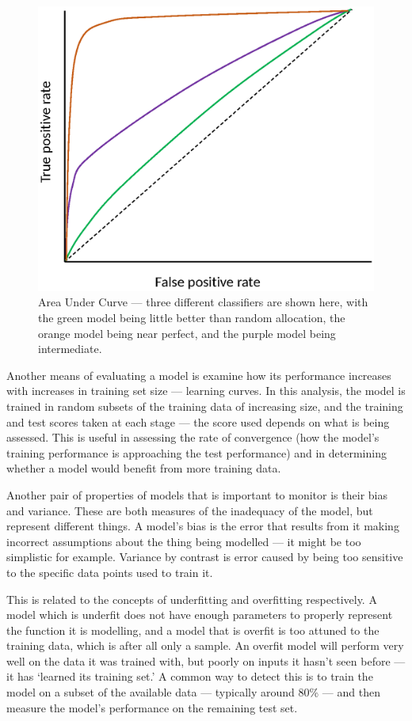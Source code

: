 \begin{figure}
\centering
\includegraphics[width=1.0\textwidth]{Figures/AUC.eps}
\caption[Area Under Curve]{\label{fig:AUC} Area Under Curve --- three different classifiers are shown here, with the green model being little better than random allocation, the orange model being near perfect, and the purple model being intermediate.}
\end{figure}


Another means of evaluating a model is examine how its performance increases with increases in training set size --- learning curves. In this analysis, the model is trained in random subsets of the training data of increasing size, and the training and test scores taken at each stage --- the score used depends on what is being assessed. This is useful in assessing the rate of convergence (how the model's training performance is approaching the test performance) and in determining whether a model would benefit from more training data.

Another pair of properties of models that is important to monitor is their bias and variance. These are both measures of the inadequacy of the model, but represent different things. A model's bias is the error that results from it making incorrect assumptions about the thing being modelled --- it might be too simplistic for example. Variance by contrast is error caused by being too sensitive to the specific data points used to train it.

This is related to the concepts of underfitting and overfitting respectively. A model which is underfit does not have enough parameters to properly represent the function it is modelling, and a model that is overfit is too attuned to the training data, which is after all only a sample. An overfit model will perform very well on the data it was trained with, but poorly on inputs it hasn't seen before --- it has `learned its training set.' A common way to detect this is to train the model on a subset of the available data --- typically around 80\% --- and then measure the model's performance on the remaining test set. 

